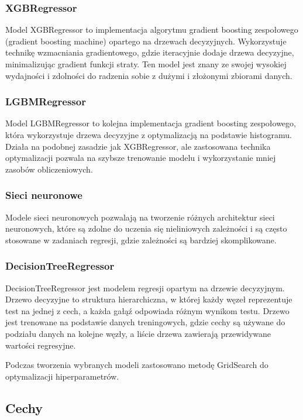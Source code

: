 \documentclass{article}
\begin{document}
\subsubsection{XGBRegressor}
Model XGBRegressor to implementacja algorytmu gradient boosting zespołowego (gradient boosting machine) opartego na drzewach decyzyjnych. Wykorzystuje technikę wzmacniania gradientowego, gdzie iteracyjnie dodaje drzewa decyzyjne, minimalizując gradient funkcji straty. Ten model jest znany ze swojej wysokiej wydajności i zdolności do radzenia sobie z dużymi i złożonymi zbiorami danych.

\subsubsection{LGBMRegressor}
Model LGBMRegressor to kolejna implementacja gradient boosting zespołowego, która wykorzystuje drzewa decyzyjne z optymalizacją na podstawie histogramu. Działa na podobnej zasadzie jak XGBRegressor, ale zastosowana technika optymalizacji pozwala na szybsze trenowanie modelu i wykorzystanie mniej zasobów obliczeniowych.

\subsubsection{Sieci neuronowe}

Modele sieci neuronowych pozwalają na tworzenie różnych architektur sieci neuronowych, które są zdolne do uczenia się nieliniowych zależności i są często stosowane w zadaniach regresji, gdzie zależności są bardziej skomplikowane.

\subsubsection{DecisionTreeRegressor}
DecisionTreeRegressor jest modelem regresji opartym na drzewie decyzyjnym. Drzewo decyzyjne to struktura hierarchiczna, w której każdy węzeł reprezentuje test na jednej z cech, a każda gałąź odpowiada różnym wynikom testu. Drzewo jest trenowane na podstawie danych treningowych, gdzie cechy są używane do podziału danych na kolejne węzły, a liście drzewa zawierają przewidywane wartości regresyjne.

\vspace{0.5cm} 
\noindent Podczas tworzenia wybranych modeli zastosowano metodę GridSearch do optymalizacji hiperparametrów.

\subsection{Cechy}
\end{document}
